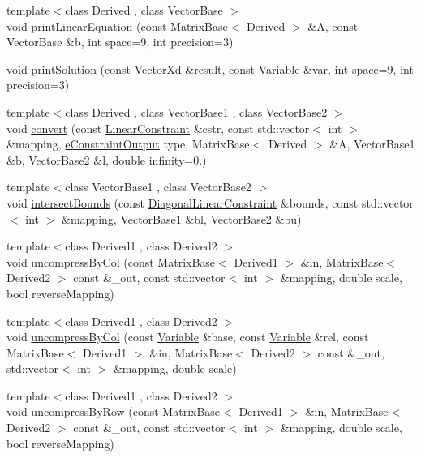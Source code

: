 \begin{DoxyCompactItemize}
\item 
{\footnotesize template$<$class Derived , class Vector\+Base $>$ }\\void \hyperlink{namespaceocra_1_1utils_aaf649f13f39cd8d32b0311ac2bfe2b4d}{print\+Linear\+Equation} (const Matrix\+Base$<$ Derived $>$ \&A, const Vector\+Base \&b, int space=9, int precision=3)
\item 
void \hyperlink{namespaceocra_1_1utils_aa928598a03da10c32b029f77c571788a}{print\+Solution} (const Vector\+Xd \&result, const \hyperlink{classocra_1_1Variable}{Variable} \&var, int space=9, int precision=3)
\item 
{\footnotesize template$<$class Derived , class Vector\+Base1 , class Vector\+Base2 $>$ }\\void \hyperlink{namespaceocra_1_1utils_a5d9dfa0a2dc2197c50ba35951f19586e}{convert} (const \hyperlink{namespaceocra_ae8b87cf4099be3efc3b410019ad2046e}{Linear\+Constraint} \&cstr, const std\+::vector$<$ int $>$ \&mapping, \hyperlink{namespaceocra_abc43c1cc74267805f1cc799c4ac27051}{e\+Constraint\+Output} type, Matrix\+Base$<$ Derived $>$ \&A, Vector\+Base1 \&b, Vector\+Base2 \&l, double infinity=0.)
\item 
{\footnotesize template$<$class Vector\+Base1 , class Vector\+Base2 $>$ }\\void \hyperlink{namespaceocra_1_1utils_aa835270370ca3a7f7b9e2858ef37dae0}{intersect\+Bounds} (const \hyperlink{namespaceocra_ab310e2c53f5e52ec3aba0a832f7dc79e}{Diagonal\+Linear\+Constraint} \&bounds, const std\+::vector$<$ int $>$ \&mapping, Vector\+Base1 \&bl, Vector\+Base2 \&bu)
\item 
{\footnotesize template$<$class Derived1 , class Derived2 $>$ }\\void \hyperlink{namespaceocra_1_1utils_adecf442a59dee26f5836a070533bcac4}{uncompress\+By\+Col} (const Matrix\+Base$<$ Derived1 $>$ \&in, Matrix\+Base$<$ Derived2 $>$ const \&\+\_\+out, const std\+::vector$<$ int $>$ \&mapping, double scale, bool reverse\+Mapping)
\item 
{\footnotesize template$<$class Derived1 , class Derived2 $>$ }\\void \hyperlink{namespaceocra_1_1utils_ae2055de35b65215e1f23b0988fe20705}{uncompress\+By\+Col} (const \hyperlink{classocra_1_1Variable}{Variable} \&base, const \hyperlink{classocra_1_1Variable}{Variable} \&rel, const Matrix\+Base$<$ Derived1 $>$ \&in, Matrix\+Base$<$ Derived2 $>$ const \&\+\_\+out, std\+::vector$<$ int $>$ \&mapping, double scale)
\item 
{\footnotesize template$<$class Derived1 , class Derived2 $>$ }\\void \hyperlink{namespaceocra_1_1utils_a151ee2cecba7ea9527fbdc8be061cd98}{uncompress\+By\+Row} (const Matrix\+Base$<$ Derived1 $>$ \&in, Matrix\+Base$<$ Derived2 $>$ const \&\+\_\+out, const std\+::vector$<$ int $>$ \&mapping, double scale, bool reverse\+Mapping)

\end{DoxyCompactItemize}
